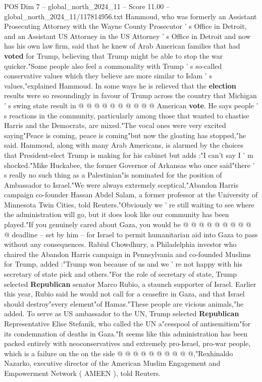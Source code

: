 \begin{textsample}{POS Dim 7 – global\_north\_2024\_11 – Score 11.00 – global\_north\_2024\_11/117814956.txt}
Hammoud, who was formerly an Assistant Prosecuting Attorney with the Wayne County Prosecutor ' s Office in Detroit, and an Assistant US Attorney in the US Attorney ' s Office in Detroit and now has his own law firm, said that he knew of Arab American families that had \textbf{voted} for Trump, believing that Trump might be able to stop the war quicker."Some people also feel a commonality with Trump ' s so-called conservative values which they believe are more similar to Islam ' s values,"explained Hammoud.
In some ways he is relieved that the \textbf{election} results were so resoundingly in favour of Trump across the country that Michigan ' s swing state result in @ @ @ @ @ @ @ @ @ @ American \textbf{vote}.
He says people ' s reactions in the community, particularly among those that wanted to chastise Harris and the Democrats, are mixed."The vocal ones were very excited saying"Peace is coming, peace is coming"but now the gloating has stopped,"he said.
Hammoud, along with many Arab Americans, is alarmed by the choices that President-elect Trump is making for his cabinet but adds :"I can't say I ' m shocked."Mike Huckabee, the former Governor of Arkansas who once said"there ' s really no such thing as a Palestinian"is nominated for the position of Ambassador to Israel."We were always extremely sceptical,"Abandon Harris campaign co-founder Hassan Abdel Salam, a former professor at the University of Minnesota Twin Cities, told Reuters."Obviously we ' re still waiting to see where the administration will go, but it does look like our community has been played."If you genuinely cared about Gaza, you would be @ @ @ @ @ @ @ @ @ @ deadline -- set by him -- for Israel to permit humanitarian aid into Gaza to pass without any consequences.
Rabiul Chowdhury, a Philadelphia investor who chaired the Abandon Harris campaign in Pennsylvania and co-founded Muslims for Trump, added :"Trump won because of us and we ' re not happy with his secretary of state pick and others."For the role of secretary of state, Trump selected \textbf{Republican} senator Marco Rubio, a staunch supporter of Israel.
Earlier this year, Rubio said he would not call for a ceasefire in Gaza, and that Israel should destroy"every element"of Hamas."These people are vicious animals,"he added.
To serve as US ambassador to the UN, Trump selected \textbf{Republican} Representative Elise Stefanik, who called the UN a"cesspool of antisemitism"for its condemnation of deaths in Gaza."It seems like this administration has been packed entirely with neoconservatives and extremely pro-Israel, pro-war people, which is a failure on the on the side @ @ @ @ @ @ @ @ @ @,"Rexhinaldo Nazarko, executive director of the American Muslim Engagement and Empowerment Network ( AMEEN ), told Reuters.

\end{textsample}
